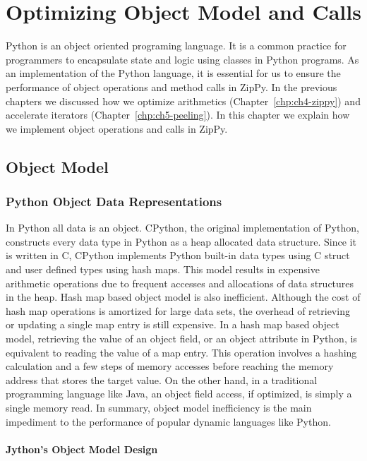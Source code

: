 \chapter{Optimizing Object Model and Calls}
\label{chp:ch6-object}

Python is an object oriented programing language.
It is a common practice for programmers to encapsulate state and logic using classes in Python programs.
As an implementation of the Python language, it is essential for us to ensure the performance of object operations and method calls in ZipPy.
In the previous chapters we discussed how we optimize arithmetics (Chapter~\ref{chp:ch4-zippy}) and accelerate iterators (Chapter~\ref{chp:ch5-peeling}).
In this chapter we explain how we implement object operations and calls in ZipPy.

\section{Object Model}
\label{sec:ch5-object-module}

\subsection{Python Object Data Representations}

In Python all data is an object.
CPython, the original implementation of Python, constructs every data type in Python as a heap allocated data structure.
Since it is written in C, CPython implements Python built-in data types using C struct and user defined types using hash maps.
This model results in expensive arithmetic operations due to frequent accesses and allocations of data structures in the heap.
Hash map based object model is also inefficient.
Although the cost of hash map operations is amortized for large data sets, the overhead of retrieving or updating a single map entry is still expensive.
In a hash map based object model, retrieving the value of an object field, or an object attribute in Python, is equivalent to reading the value of a map entry.
This operation involves a hashing calculation and a few steps of memory accesses before reaching the memory address that stores the target value.
On the other hand, in a traditional programming language like Java, an object field access, if optimized, is simply a single memory read.
In summary, object model inefficiency is the main impediment to the performance of popular dynamic languages like Python.

\subsubsection{Jython's Object Model Design}

